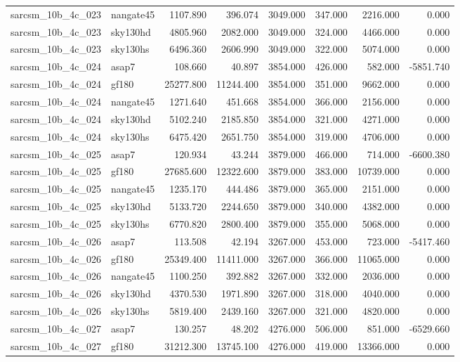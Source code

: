 \begin{tabular}{llrrrrrr}
sarcsm\_10b\_4c\_023 & nangate45 & 1107.890 & 396.074 & 3049.000 & 347.000 & 2216.000 & 0.000 \\
sarcsm\_10b\_4c\_023 & sky130hd & 4805.960 & 2082.000 & 3049.000 & 324.000 & 4466.000 & 0.000 \\
sarcsm\_10b\_4c\_023 & sky130hs & 6496.360 & 2606.990 & 3049.000 & 322.000 & 5074.000 & 0.000 \\
sarcsm\_10b\_4c\_024 & asap7 & 108.660 & 40.897 & 3854.000 & 426.000 & 582.000 & -5851.740 \\
sarcsm\_10b\_4c\_024 & gf180 & 25277.800 & 11244.400 & 3854.000 & 351.000 & 9662.000 & 0.000 \\
sarcsm\_10b\_4c\_024 & nangate45 & 1271.640 & 451.668 & 3854.000 & 366.000 & 2156.000 & 0.000 \\
sarcsm\_10b\_4c\_024 & sky130hd & 5102.240 & 2185.850 & 3854.000 & 321.000 & 4271.000 & 0.000 \\
sarcsm\_10b\_4c\_024 & sky130hs & 6475.420 & 2651.750 & 3854.000 & 319.000 & 4706.000 & 0.000 \\
sarcsm\_10b\_4c\_025 & asap7 & 120.934 & 43.244 & 3879.000 & 466.000 & 714.000 & -6600.380 \\
sarcsm\_10b\_4c\_025 & gf180 & 27685.600 & 12322.600 & 3879.000 & 383.000 & 10739.000 & 0.000 \\
sarcsm\_10b\_4c\_025 & nangate45 & 1235.170 & 444.486 & 3879.000 & 365.000 & 2151.000 & 0.000 \\
sarcsm\_10b\_4c\_025 & sky130hd & 5133.720 & 2244.650 & 3879.000 & 340.000 & 4382.000 & 0.000 \\
sarcsm\_10b\_4c\_025 & sky130hs & 6770.820 & 2800.400 & 3879.000 & 355.000 & 5068.000 & 0.000 \\
sarcsm\_10b\_4c\_026 & asap7 & 113.508 & 42.194 & 3267.000 & 453.000 & 723.000 & -5417.460 \\
sarcsm\_10b\_4c\_026 & gf180 & 25349.400 & 11411.000 & 3267.000 & 366.000 & 11065.000 & 0.000 \\
sarcsm\_10b\_4c\_026 & nangate45 & 1100.250 & 392.882 & 3267.000 & 332.000 & 2036.000 & 0.000 \\
sarcsm\_10b\_4c\_026 & sky130hd & 4370.530 & 1971.890 & 3267.000 & 318.000 & 4040.000 & 0.000 \\
sarcsm\_10b\_4c\_026 & sky130hs & 5819.400 & 2439.160 & 3267.000 & 321.000 & 4820.000 & 0.000 \\
sarcsm\_10b\_4c\_027 & asap7 & 130.257 & 48.202 & 4276.000 & 506.000 & 851.000 & -6529.660 \\
sarcsm\_10b\_4c\_027 & gf180 & 31212.300 & 13745.100 & 4276.000 & 419.000 & 13366.000 & 0.000 \\

\end{tabular}
